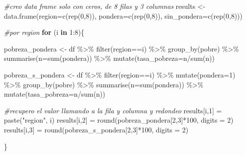 \documentclass[
]{book}
\newenvironment{Shaded}{\begin{snugshade}}{\end{snugshade}}
\newcommand{\AttributeTok}[1]{\textcolor[rgb]{0.77,0.63,0.00}{#1}}
\newcommand{\CommentTok}[1]{\textcolor[rgb]{0.56,0.35,0.01}{\textit{#1}}}
\newcommand{\ControlFlowTok}[1]{\textcolor[rgb]{0.13,0.29,0.53}{\textbf{#1}}}
\newcommand{\DecValTok}[1]{\textcolor[rgb]{0.00,0.00,0.81}{#1}}
\newcommand{\FunctionTok}[1]{\textcolor[rgb]{0.00,0.00,0.00}{#1}}
\newcommand{\NormalTok}[1]{#1}
\newcommand{\OtherTok}[1]{\textcolor[rgb]{0.56,0.35,0.01}{#1}}
\newcommand{\SpecialCharTok}[1]{\textcolor[rgb]{0.00,0.00,0.00}{#1}}
\newcommand{\StringTok}[1]{\textcolor[rgb]{0.31,0.60,0.02}{#1}}
\begin{document}
\begin{Shaded}
\begin{Highlighting}[]
\CommentTok{\#creo data frame solo con ceros, de 8 filas y 3 columnas}
\NormalTok{results }\OtherTok{\textless{}{-}} \FunctionTok{data.frame}\NormalTok{(}\AttributeTok{region=}\FunctionTok{c}\NormalTok{(}\FunctionTok{rep}\NormalTok{(}\DecValTok{0}\NormalTok{,}\DecValTok{8}\NormalTok{)),}
                      \AttributeTok{pondera=}\FunctionTok{c}\NormalTok{(}\FunctionTok{rep}\NormalTok{(}\DecValTok{0}\NormalTok{,}\DecValTok{8}\NormalTok{)),}
                      \AttributeTok{sin\_pondera=}\FunctionTok{c}\NormalTok{(}\FunctionTok{rep}\NormalTok{(}\DecValTok{0}\NormalTok{,}\DecValTok{8}\NormalTok{)))}

\CommentTok{\#por region}
\ControlFlowTok{for}\NormalTok{ (i }\ControlFlowTok{in} \DecValTok{1}\SpecialCharTok{:}\DecValTok{8}\NormalTok{)\{}
  
\NormalTok{  pobreza\_pondera }\OtherTok{\textless{}{-}}\NormalTok{ df }\SpecialCharTok{\%\textgreater{}\%} \FunctionTok{filter}\NormalTok{(region}\SpecialCharTok{==}\NormalTok{i) }\SpecialCharTok{\%\textgreater{}\%} \FunctionTok{group\_by}\NormalTok{(pobre) }\SpecialCharTok{\%\textgreater{}\%} \FunctionTok{summarise}\NormalTok{(}\AttributeTok{n=}\FunctionTok{sum}\NormalTok{(pondera)) }\SpecialCharTok{\%\textgreater{}\%} 
                                                                  \FunctionTok{mutate}\NormalTok{(}\AttributeTok{tasa\_pobreza=}\NormalTok{n}\SpecialCharTok{/}\FunctionTok{sum}\NormalTok{(n))}
  
\NormalTok{  pobreza\_s\_pondera }\OtherTok{\textless{}{-}}\NormalTok{ df }\SpecialCharTok{\%\textgreater{}\%} \FunctionTok{filter}\NormalTok{(region}\SpecialCharTok{==}\NormalTok{i) }\SpecialCharTok{\%\textgreater{}\%} \FunctionTok{mutate}\NormalTok{(}\AttributeTok{pondera=}\DecValTok{1}\NormalTok{) }\SpecialCharTok{\%\textgreater{}\%} \FunctionTok{group\_by}\NormalTok{(pobre) }\SpecialCharTok{\%\textgreater{}\%} \FunctionTok{summarise}\NormalTok{(}\AttributeTok{n=}\FunctionTok{sum}\NormalTok{(pondera)) }\SpecialCharTok{\%\textgreater{}\%}
                                                                                          \FunctionTok{mutate}\NormalTok{(}\AttributeTok{tasa\_pobreza=}\NormalTok{n}\SpecialCharTok{/}\FunctionTok{sum}\NormalTok{(n))}
  
  \CommentTok{\#recupero el valor llamando a la fila y columna y redondeo }
\NormalTok{  results[i,}\DecValTok{1}\NormalTok{] }\OtherTok{=} \FunctionTok{paste}\NormalTok{(}\StringTok{"region"}\NormalTok{, i)}
\NormalTok{  results[i,}\DecValTok{2}\NormalTok{] }\OtherTok{=} \FunctionTok{round}\NormalTok{(pobreza\_pondera[}\DecValTok{2}\NormalTok{,}\DecValTok{3}\NormalTok{]}\SpecialCharTok{*}\DecValTok{100}\NormalTok{, }\AttributeTok{digits =} \DecValTok{2}\NormalTok{)}
\NormalTok{  results[i,}\DecValTok{3}\NormalTok{] }\OtherTok{=} \FunctionTok{round}\NormalTok{(pobreza\_s\_pondera[}\DecValTok{2}\NormalTok{,}\DecValTok{3}\NormalTok{]}\SpecialCharTok{*}\DecValTok{100}\NormalTok{, }\AttributeTok{digits =} \DecValTok{2}\NormalTok{)}
  
\NormalTok{\}}
\end{Highlighting}
\end{Shaded}
\end{document}
